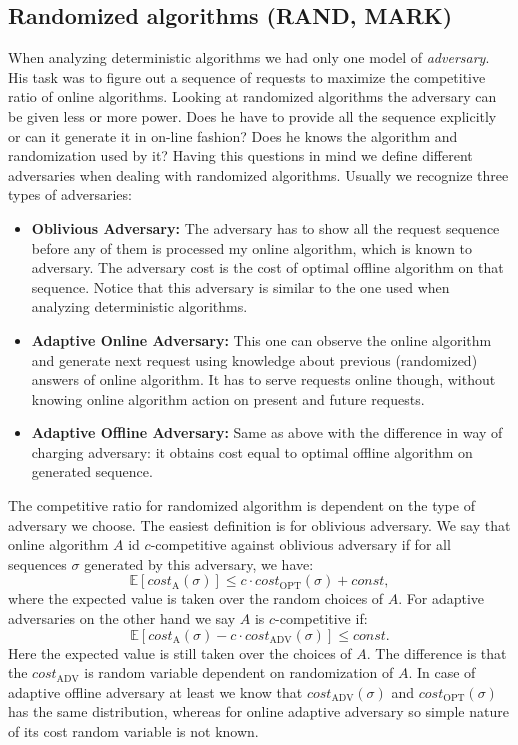 \subsection{Randomized algorithms (RAND, MARK)}
When analyzing deterministic algorithms we had only one model of 
\textit{adversary}. His task was to figure out a sequence of requests to 
maximize the competitive ratio of online algorithms. Looking at randomized 
algorithms the adversary can be given less or more power. Does he have to 
provide all the sequence explicitly or can it generate it in on-line fashion? 
Does he knows the algorithm and randomization used by it? Having this questions 
in mind we define different adversaries when dealing with randomized 
algorithms. Usually we recognize three types of adversaries:
\begin{itemize}
\item \textbf{Oblivious Adversary:} The adversary has to show all the request 
sequence before any of them is processed my online algorithm, which is known to 
adversary. The adversary cost is the cost of optimal offline algorithm on that 
sequence. Notice that this adversary is similar to the one used when analyzing
deterministic algorithms.
\item \textbf{Adaptive Online Adversary:} This one can observe the online 
algorithm and generate next request using knowledge about previous (randomized) 
answers of online algorithm. It has to serve requests online though, without 
knowing online algorithm action on present and future requests.
\item \textbf{Adaptive Offline Adversary:} Same as above with the difference in 
way of charging adversary: it obtains cost equal to optimal offline algorithm 
on generated sequence.
\end{itemize}
The competitive ratio for randomized algorithm is dependent on the type of 
adversary we choose. The easiest definition is for oblivious adversary. We say 
that online algorithm $A$ id $c$-competitive against oblivious adversary if for 
all sequences $\sigma$ generated by this adversary, we have:
$$\mathbb{E}[cost_{\mathrm{A}}(\sigma)] \leq c\cdot cost_{\mathrm{OPT}}(\sigma) 
+ const,$$
where the expected value is taken over the random choices of $A$. For adaptive 
adversaries on the other hand we say $A$ is $c$-competitive if:
$$\mathbb{E}[cost_{\mathrm{A}}(\sigma) - c \cdot cost_{\mathrm{ADV}}(\sigma)]
\leq const.$$
Here the expected value is still taken over the choices of $A$. The difference 
is that the $cost_{\mathrm{ADV}}$ is random variable dependent on randomization 
of $A$. 
In case of adaptive offline adversary at least we know that 
$cost_{\mathrm{ADV}}(\sigma)$ and $cost_{\mathrm{OPT}}(\sigma)$ has the same 
distribution, whereas for online 
adaptive adversary so simple nature of its cost random variable is not known.

